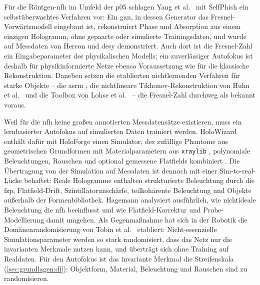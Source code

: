Für die Röntgen-\ac{nfh} im Umfeld der \ac{p05} schlagen
Yang et al.\ \cite{yang2025selfphish} mit SelfPhish ein selbstüberwachtes Verfahren vor:
Ein \ac{gan}, in dessen Generator das Fresnel-Vorwärtsmodell eingebaut ist,
rekonstruiert Phase und Absorption aus einem einzigen Hologramm, ohne
gepaarte oder simulierte Trainingsdaten, und wurde auf Messdaten von
Hereon und \ac{desy} demonstriert. Auch dort ist die Fresnel-Zahl ein
Eingabeparameter des physikalischen Modells; ein zuverlässiger Autofokus
ist deshalb für physikinformierte Netze ebenso Voraussetzung wie für die
klassische Rekonstruktion. Daneben setzen die etablierten
nichtlernenden Verfahren für starke Objekte -- die \ac{asrm}
\cite{dora2024asrm}, die nichtlineare Tikhonov-Rekonstruktion von
Huhn et al.\ \cite{huhn2022tikhonov} und die Toolbox von Lohse et al.\
\cite{lohse2020toolbox} --
die Fresnel-Zahl durchweg als bekannt voraus.

Weil für die \ac{nfh} keine großen annotierten Messdatensätze existieren,
muss ein lernbasierter Autofokus auf simulierten Daten trainiert werden.
HoloWizard enthält dafür mit HoloForge einen Simulator, der zufällige
Phantome aus geometrischen Grundformen mit Materialparametern aus
\texttt{xraylib} \cite{schoonjans2011xraylib}, polynomiale Beleuchtungen,
Rauschen und optional gemessene Flatfields kombiniert
\cite{dora2026holowizard}. Die Übertragung von der Simulation auf
Messdaten ist dennoch mit einer Sim-to-real-Lücke behaftet: Reale
Hologramme enthalten strukturierte Beleuchtung durch die \ac{fzp},
Flatfield-Drift, Szintillatorunschärfe, teilkohärente Beleuchtung und
Objekte außerhalb der Formenbibliothek. Hagemann \cite{hagemann2017thesis}
analysiert ausführlich, wie nichtideale Beleuchtung die \ac{nfh} beeinflusst
und wie Flatfield-Korrektur und Probe-Modellierung damit umgehen. Als
Gegenmaßnahme hat sich in der Robotik die Domänenrandomisierung von
Tobin et al.\ \cite{tobin2017domain} etabliert: Nicht-essenzielle Simulationsparameter
werden so stark randomisiert, dass das Netz nur die invarianten Merkmale
nutzen kann, und überträgt sich ohne Training auf Realdaten. Für den
Autofokus ist das invariante Merkmal die Streifenskala
(\cref{sec:grundlagen:dl}); Objektform, Material, Beleuchtung und Rauschen
sind zu randomisieren.

\section{}
\label{sec:stand:unsicherheit}

